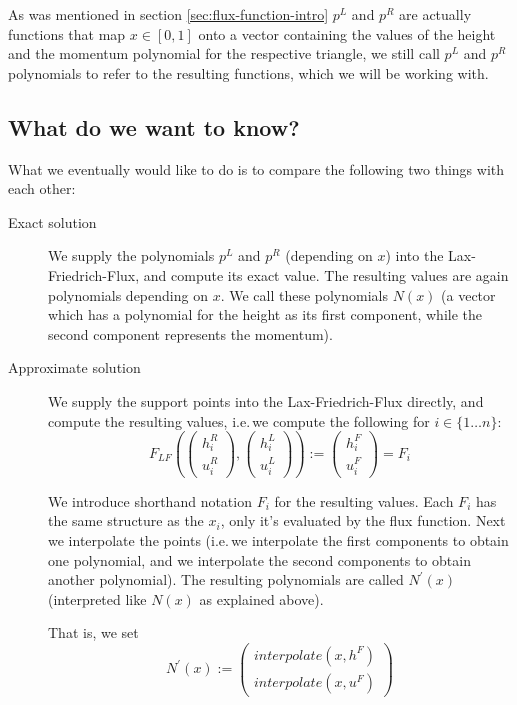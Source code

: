 \documentclass{article}
\begin{document}
As was mentioned in section \ref{sec:flux-function-intro} $p^L$ and $p^R$ are actually functions that map $x \in [0,1]$ onto a vector containing the values of the height and the momentum polynomial for the respective triangle, we still call $p^L$ and $p^R$ polynomials to refer to the resulting functions, which we will be working with.

\subsection{What do we want to know?}
\label{sec:goal-intro}

What we eventually would like to do is to compare the following two things with each other:

\begin{description}
\item[Exact solution] We supply the polynomials $p^L$ and $p^R$ (depending on $x$) into the Lax-Friedrich-Flux, and compute its exact value. The resulting values are again polynomials depending on $x$. We call these polynomials $N\left(x\right)$ (a vector which has a polynomial for the height as its first component, while the second component represents the momentum).

\item[Approximate solution] We supply the support points into the Lax-Friedrich-Flux directly, and compute the resulting values, i.e.\,we compute the following for $i \in \{1 \dots n\}$:
  \begin{equation*}
    F_{LF}\left(
      \begin{pmatrix}
        h_i^R \\ u_i^R
      \end{pmatrix},
      \begin{pmatrix}
        h_i^L \\ u_i^L
      \end{pmatrix}
    \right) :=
    \begin{pmatrix}
      h_i^F \\ u_i^F
    \end{pmatrix} = F_i
  \end{equation*}

  We introduce shorthand notation $F_i$ for the resulting values. Each $F_i$ has the same structure as the $x_i$, only it's evaluated by the flux function. Next we interpolate the points (i.e.\,we interpolate the first components to obtain one polynomial, and we interpolate the second components to obtain another polynomial). The resulting polynomials are called $N^\prime\left(x\right)$ (interpreted like $N\left(x\right)$ as explained above).

  That is, we set
  \begin{equation*}
    N^\prime\left(x\right) :=
    \begin{pmatrix}
      interpolate\left(x,h^F\right) \\ interpolate\left(x,u^F\right)
    \end{pmatrix}
  \end{equation*}

\end{description}
\end{document}
